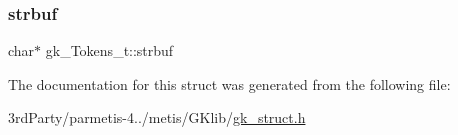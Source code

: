 \mbox{\label{structgk___tokens__t_a2770337d903acb342ec9540882b53601}} 
\subsubsection{\texorpdfstring{strbuf}{strbuf}}
{\footnotesize\ttfamily char$\ast$ gk\+\_\+\+Tokens\+\_\+t\+::strbuf}



The documentation for this struct was generated from the following file\+:\begin{DoxyCompactItemize}
\item 
3rd\+Party/parmetis-\/4../metis/\+G\+Klib/\hyperlink{gk__struct_8h}{gk\+\_\+struct.\+h}\end{DoxyCompactItemize}
